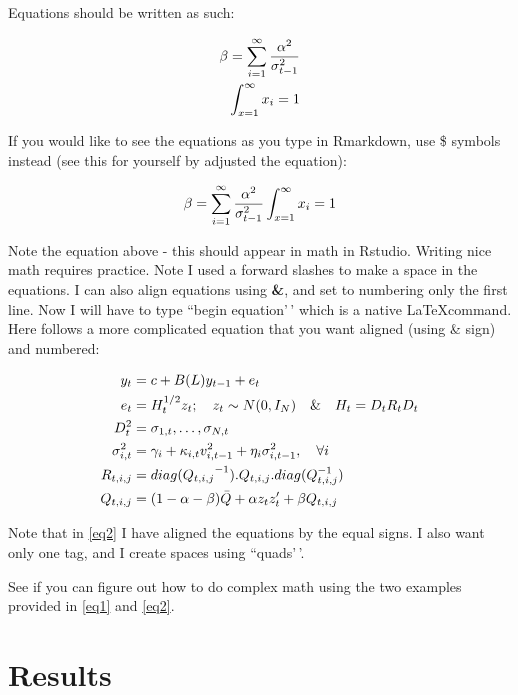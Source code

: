 \documentclass[11pt,preprint, authoryear]{elsarticle}
\numberwithin{equation}{section}
\numberwithin{figure}{section}
\numberwithin{table}{section}
\begin{document}
Equations should be written as such:

\begin{align}
\beta = \sum_{i = 1}^{\infty}\frac{\alpha^2}{\sigma_{t-1}^2} \label{eq1} \\
\int_{x = 1}^{\infty}x_{i} = 1 \notag
\end{align}

If you would like to see the equations as you type in Rmarkdown, use \$
symbols instead (see this for yourself by adjusted the equation):

\[
\beta = \sum_{i = 1}^{\infty}\frac{\alpha^2}{\sigma_{t-1}^2} \\
\int_{x = 1}^{\infty}x_{i} = 1
\]

Note the equation above - this should appear in math in Rstudio. Writing
nice math requires practice. Note I used a forward slashes to make a
space in the equations. I can also align equations using \textbf{\&},
and set to numbering only the first line. Now I will have to type
``begin equation'\,' which is a native \LaTeX command. Here follows a
more complicated equation that you want aligned (using \& sign) and
numbered:

\begin{align}
    y_t &= c + B(L) y_{t-1} + e_t   \label{eq2}    \\ \notag
    e_t &= H_t^{1/2}  z_t ; \quad z_t \sim  N(0,I_N) \quad \& \quad H_t = D_tR_tD_t \\ \notag
        D_t^2 &= {\sigma_{1,t}, \dots, \sigma_{N,t}}   \\ \notag
        \sigma_{i,t}^2 &= \gamma_i+\kappa_{i,t}  v_{i, t-1}^2 +\eta_i  \sigma_{i, t-1}^2, \quad \forall i \\ \notag
        R_{t, i, j} &= {diag(Q_{t, i, j}}^{-1}) . Q_{t, i, j} . diag(Q_{t, i, j}^{-1})  \\ \notag
        Q_{t, i, j} &= (1-\alpha-\beta)  \bar{Q} + \alpha  z_t  z_t'  + \beta  Q_{t, i, j} \notag
\end{align}

Note that in \ref{eq2} I have aligned the equations by the equal signs.
I also want only one tag, and I create spaces using ``quads'\,'.

See if you can figure out how to do complex math using the two examples
provided in \ref{eq1} and \ref{eq2}.

\hypertarget{results}{%
\section{Results}\label{results}}
\end{document}
